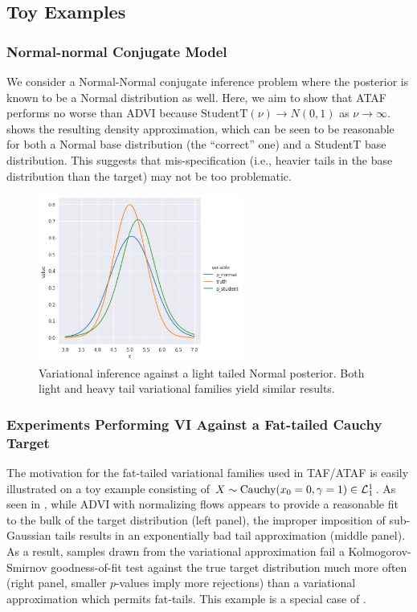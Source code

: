 \documentclass[../../thesis.tex]{subfiles}
\begin{document}
\subsection{Toy Examples}
\subsubsection{Normal-normal Conjugate Model}
\label{sec:normal-normal-location-mixture}

We consider a Normal-Normal conjugate inference problem where the posterior
is known to be a Normal distribution as well. Here, we aim to show that ATAF
performs no worse than ADVI because $\text{StudentT}(\nu) \to N(0, 1)$ as $\nu \to \infty$.
 shows the resulting density approximation, which can
be seen to be reasonable for both a Normal base distribution (the ``correct'' one)
and a StudentT base distribution. This suggests that mis-specification (i.e., heavier
tails in the base distribution than the target) may not be too problematic.

\begin{figure}[H]
  \centering
  \includegraphics[width=0.6\textwidth]{ftvi/Figures/normal_normal_posterior.png}
  \caption{Variational inference against a light tailed Normal posterior. Both light and heavy tail
    variational families yield similar results.}
  \label{fig:normal_normal}
\end{figure}

\subsubsection{Experiments Performing VI Against a Fat-tailed Cauchy Target}
\label{sec:cauchy_normal_student}
The motivation for the fat-tailed variational families used in TAF/ATAF
is easily illustrated on a toy example consisting of $X \sim \text{Cauchy}(x_0 = 0, \gamma = 1) \in \mathcal{L}^1_1$.
As seen in , while ADVI with normalizing flows \citep{kingma2016improved,webb2019improving}
appears to provide a reasonable fit to the bulk of the target distribution (left panel), the improper
imposition of sub-Gaussian tails results in an exponentially bad tail approximation (middle panel).
As a result, samples drawn from the variational approximation fail a Kolmogorov-Smirnov goodness-of-fit
test against the true target distribution much more often (right panel, smaller $p$-values imply more rejections)
than a variational approximation which permits fat-tails. This example is a special case of .
\end{document}

